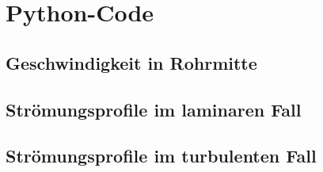 %
\section{Python-Code}
\label{app:python}

\subsection{Geschwindigkeit in Rohrmitte}
\label{app:python:rohrmitte}



\clearpage
\subsection{Str\"omungsprofile im laminaren Fall}
\label{app:python:laminar}



\clearpage
\subsection{Str\"omungsprofile im turbulenten Fall}
\label{app:python:turbulent}


